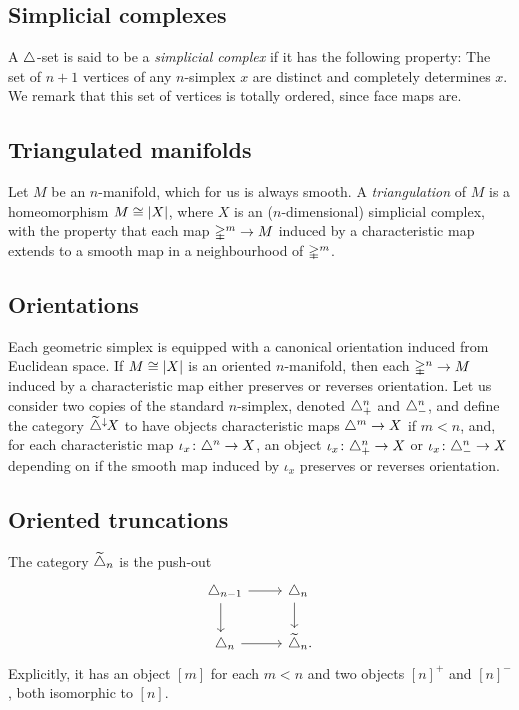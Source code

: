\subsection{Simplicial complexes}

A $\triangle$-set is said to be a \textit{simplicial complex} if it has the following property: The set of $n+1$ vertices of any $n$-simplex $x$ are distinct and completely determines $x$.
We remark that this set of vertices is totally ordered, since face maps are.

\subsection{Triangulated manifolds}

Let $M$ be an $n$-manifold, which for us is always smooth.
A \textit{triangulation} of $M$ is a homeomorphism $M \cong \lvert X\rvert$, where $X$ is an ($n$-dimensional) simplicial complex, with the property that each map $\mathbb{\Delta}^m \to M$ induced by a characteristic map extends to a smooth map in a neighbourhood of $\mathbb{\Delta}^m$.

\subsection{Orientations}

Each geometric simplex is equipped with a canonical orientation induced from Euclidean space.
If $M \cong \lvert X\rvert$ is an oriented $n$-manifold, then each $\mathbb{\Delta}^n \to M$ induced by a characteristic map either preserves or reverses orientation.
Let us consider two copies of the standard $n$-simplex, denoted $\triangle^n_+$ and $\triangle^n_-$, and define the category $\widetilde{\triangle}^\downarrow\hspace{-1pt}X$ to have objects characteristic maps $\triangle^m \to X$ if $m < n$, and, for each characteristic map $\iota_x \colon \triangle^n \to X$, an object $\iota_x \colon \triangle^n_+ \to X$ or $\iota_x \colon \triangle^n_- \to X$ depending on if the smooth map induced by $\iota_x$ preserves or reverses orientation.

\subsection{Oriented truncations}

The category $\widetilde{\triangle}_n$ is the push-out
\[
\begin{tikzcd}
	\simplex_{n-1} \rar \arrow[d,shift right=3pt] & \simplex_n \arrow[d,shift right=4pt] \phantom{.}\\  \simplex_n \rar & \widetilde\simplex_n.
\end{tikzcd}
\]
Explicitly, it has an object $[m]$ for each $m < n$ and two objects $[n]^+$ and $[n]^-$, both isomorphic to $[n]$.

